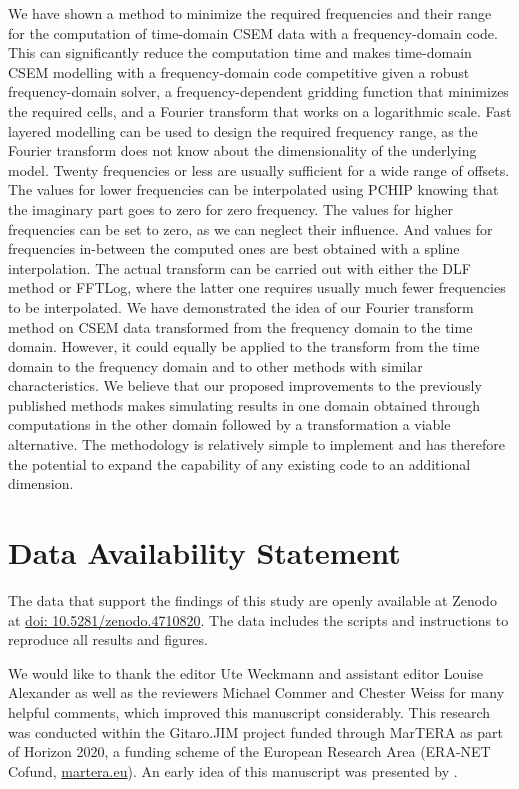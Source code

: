 \documentclass[extra, camera,%
]{gji}
\begin{document}
We have shown a method to minimize the required frequencies and their range for
the computation of time-domain CSEM data with a frequency-domain code. This can
significantly reduce the computation time and makes time-domain CSEM modelling
with a frequency-domain code competitive given a robust frequency-domain
solver, a frequency-dependent gridding function that minimizes the required
cells, and a Fourier transform that works on a logarithmic scale. Fast layered
modelling can be used to design the required frequency range, as the Fourier
transform does not know about the dimensionality of the underlying model.
Twenty frequencies or less are usually sufficient for a wide range of offsets.
The values for lower frequencies can be interpolated using PCHIP knowing that
the imaginary part goes to zero for zero frequency. The values for higher
frequencies can be set to zero, as we can neglect their influence. And values
for frequencies in-between the computed ones are best obtained with a spline
interpolation. The actual transform can be carried out with either the DLF
method or FFTLog, where the latter one requires usually much fewer frequencies
to be interpolated. We have demonstrated the idea of our Fourier transform
method on CSEM data transformed from the frequency domain to the time domain.
However, it could equally be applied to the transform from the time domain to
the frequency domain and to other methods with similar characteristics. We
believe that our proposed improvements to the previously published methods
makes simulating results in one domain obtained through computations in the
other domain followed by a transformation a viable alternative. The methodology
is relatively simple to implement and has therefore the potential to expand the
capability of any existing code to an additional dimension.

\section{Data Availability Statement} %

The data that support the findings of this study are openly available at Zenodo
at \href{https://doi.org/10.5281/zenodo.4710820}{doi: 10.5281/zenodo.4710820}.
The data includes the scripts and instructions to reproduce all results and
figures.


\begin{acknowledgments} %
  We would like to thank the editor Ute Weckmann and assistant editor Louise
  Alexander as well as the reviewers Michael Commer and Chester Weiss for many
  helpful comments, which improved this manuscript considerably. This research
  was conducted within the Gitaro.JIM project funded through MarTERA as part of
  Horizon 2020, a funding scheme of the European Research Area (ERA-NET Cofund,
  \href{https://www.martera.eu}{martera.eu}). An early idea of this manuscript
  was presented by \cite{EAGE.20.Werthmuller}.
\end{acknowledgments}





\label{lastpage}
\end{document}
